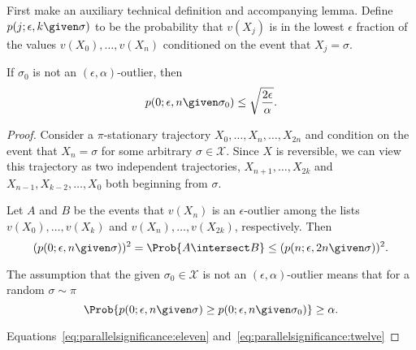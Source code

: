 \documentclass[12pt]{article}
\begin{document}
First make an auxiliary technical definition and accompanying lemma.
Define \( p(j; \epsilon,k \given \sigma) \) to be the probability that
\( v(X_j) \) is in the lowest \( \epsilon \) fraction of the values \(
v(X_0), \dots, v(X_n) \) conditioned on the event that \( X_j = \sigma
\).

\begin{lemma}
     If \( \sigma_0 \) is not an \( (\epsilon,\alpha) \)-outlier, then
     \begin{equation}
     \label{eq:parallelsignificance:nine} p(0; \epsilon, n \given
     \sigma_0) \le \sqrt{\frac{2 \epsilon}{\alpha}}.
     \end{equation}
\end{lemma}

\begin{proof}
          \item
            Consider a \( \pi \)-stationary
            trajectory \( X_0, \dots, X_n, \dots, X_{2n} \) and
            condition on the event that \( X_n = \sigma \) for some
            arbitrary \( \sigma \in \mathcal{X} \).  Since \( X \) is
            reversible, we can view this trajectory as two independent
            trajectories, \( X_{n+1}, \dots, X_{2k} \) and \( X_{n-1}, X_
            {k-2}, \dots, X_0 \) both beginning from \( \sigma \).
        \item
            Let \( A \) and \( B \) be the events that \( v(X_n) \) is
            an \( \epsilon \)-outlier among the lists \( v(X_0), \dots,
            v(X_k) \) and \( v(X_n), \dots, v(X_{2k}) \), respectively.
            Then
            \begin{equation}
                \label{eq:parallelsignificance:eleven} (p(0; \epsilon, n \given
                \sigma))^2 = \Prob{ A \intersect B} \le (p(n; \epsilon,
                2n \given \sigma))^2.
            \end{equation}
        \item
            The assumption that the given \( \sigma_0 \in \mathcal{X} \)
            is not an \( (\epsilon, \alpha) \)-outlier means that for a
            random \( \sigma \sim \pi \)
            \begin{equation}
                \label{eq:parallelsignificance:twelve} \Prob{ p(0; \epsilon, n
                \given \sigma) \ge p(0; \epsilon, n \given \sigma_0) }
                \ge \alpha.
            \end{equation}
        \item
            Equations~\eqref{eq:parallelsignificance:eleven} and~\eqref{eq:parallelsignificance:twelve}

\end{proof}
\end{document}
